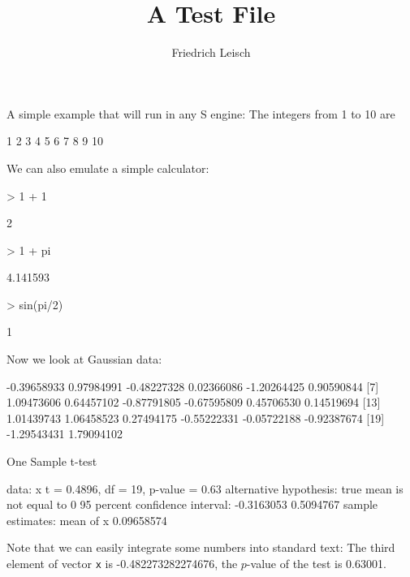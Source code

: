 \documentclass[a4paper]{article}
\title{A Test File}
\author{Friedrich Leisch}
\begin{document}
\maketitle

A simple example that will run in any S engine: The integers from 1 to
10 are
\begin{Schunk}
\begin{Soutput}
 [1]  1  2  3  4  5  6  7  8  9 10
\end{Soutput}
\end{Schunk}

We can also emulate a simple calculator:
\begin{Schunk}
\begin{Sinput}
> 1 + 1
\end{Sinput}
\begin{Soutput}
[1] 2
\end{Soutput}
\begin{Sinput}
> 1 + pi
\end{Sinput}
\begin{Soutput}
[1] 4.141593
\end{Soutput}
\begin{Sinput}
> sin(pi/2)
\end{Sinput}
\begin{Soutput}
[1] 1
\end{Soutput}
\end{Schunk}

Now we look at Gaussian data:

\begin{Schunk}
\begin{Soutput}
 [1] -0.39658933  0.97984991 -0.48227328  0.02366086 -1.20264425  0.90590844
 [7]  1.09473606  0.64457102 -0.87791805 -0.67595809  0.45706530  0.14519694
[13]  1.01439743  1.06458523  0.27494175 -0.55222331 -0.05722188 -0.92387674
[19] -1.29543431  1.79094102
\end{Soutput}
\begin{Soutput}
	One Sample t-test

data:  x 
t = 0.4896, df = 19, p-value = 0.63
alternative hypothesis: true mean is not equal to 0 
95 percent confidence interval:
 -0.3163053  0.5094767 
sample estimates:
 mean of x 
0.09658574 
\end{Soutput}
\end{Schunk}
Note that we can easily integrate some numbers into standard text: The
third element of vector \texttt{x} is -0.482273282274676, the
$p$-value of the test is 0.63001. %
\end{document}
